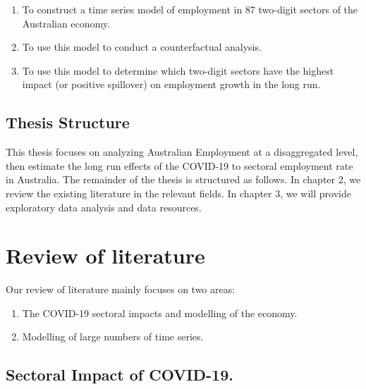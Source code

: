 \documentclass{monashthesis}
\begin{document}
\begin{enumerate}
\def\labelenumi{\arabic{enumi}.}
\item
  To construct a time series model of employment in 87 two-digit sectors of the Australian economy.
\item
  To use this model to conduct a counterfactual analysis.
\item
  To use this model to determine which two-digit sectors have the highest impact (or positive spillover) on employment growth in the long run.
\end{enumerate}

\hypertarget{thesis-structure}{%
\section{Thesis Structure}\label{thesis-structure}}

This thesis focuses on analyzing Australian Employment at a disaggregated level, then estimate the long run effects of the COVID-19 to sectoral employment rate in Australia. The remainder of the thesis is structured as follows. In chapter 2, we review the existing literature in the relevant fields. In chapter 3, we will provide exploratory data analysis and data resources.

\clearpage

\hypertarget{review-of-literature}{%
\chapter{Review of literature}\label{review-of-literature}}

Our review of literature mainly focuses on two areas:

\begin{enumerate}
\def\labelenumi{\arabic{enumi}.}
\item
  The COVID-19 sectoral impacts and modelling of the economy.
\item
  Modelling of large numbers of time series.
\end{enumerate}

\hypertarget{sectoral-impact-of-covid-19.}{%
\section{Sectoral Impact of COVID-19.}\label{sectoral-impact-of-covid-19.}}
\end{document}
